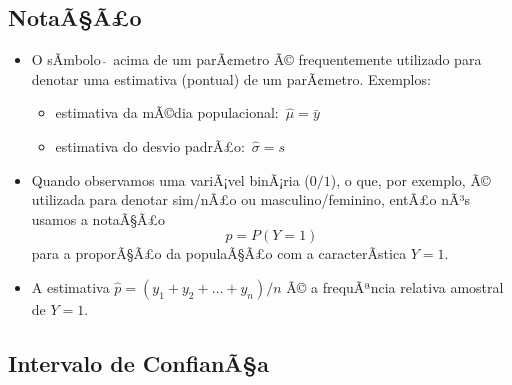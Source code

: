 \documentclass[]{article}
\providecommand{\tightlist}{%
  \setlength{\itemsep}{0pt}\setlength{\parskip}{0pt}}
\begin{document}
\subsection{NotaÃ§Ã£o}\label{notaaao}

\begin{itemize}
\tightlist
\item
  O sÃ­mbolo \(\hat{\ }\) acima de um parÃ¢metro Ã© frequentemente
  utilizado para denotar uma estimativa (pontual) de um parÃ¢metro.
  Exemplos:

  \begin{itemize}
  \tightlist
  \item
    estimativa da mÃ©dia populacional:~\(\hat{\mu}=\bar{y}\)
  \item
    estimativa do desvio padrÃ£o:~\(\hat{\sigma}=s\)
  \end{itemize}
\item
  Quando observamos uma variÃ¡vel binÃ¡ria (\(0/1\)), o que, por
  exemplo, Ã© utilizada para denotar sim/nÃ£o ou masculino/feminino,
  entÃ£o nÃ³s usamos a notaÃ§Ã£o \[p=P(Y=1)\] para a proporÃ§Ã£o da
  populaÃ§Ã£o com a caracterÃ­stica \(Y=1\).
\item
  A estimativa \(\hat{p}=(y_1+y_2+\ldots+y_n)/n\) Ã© a frequÃªncia
  relativa amostral de \(Y=1\).
\end{itemize}

\subsection{Intervalo de ConfianÃ§a}\label{intervalo-de-confianaa}
\end{document}
